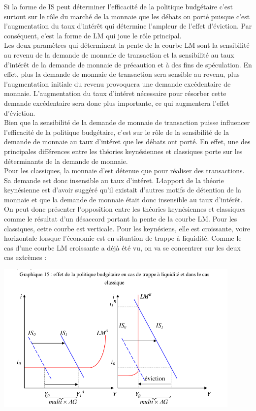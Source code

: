 \documentclass[10pt]{book}
\begin{document}
Si la forme de IS peut déterminer l'efficacité de la politique budgétaire c'est surtout sur le rôle du marché de la monnaie que les débats on porté puisque c'est l'augmentation du taux d'intérêt qui détermine l'ampleur de  l'effet d'éviction. Par conséquent, c'est la forme de LM qui joue le rôle principal. \\
Les deux paramètres qui déterminent la pente de la courbe LM sont la sensibilité au revenu de la demande de monnaie de transaction et la sensibilité au taux d'intérêt de la demande de monnaie de précaution et à des fins de spéculation. En effet, plus la demande de monnaie de transaction sera sensible au revenu, plus l'augmentation initiale du revenu provoquera une demande excédentaire de monnaie. L'augmentation du taux d'intéret nécessaire pour résorber cette demande excédentaire sera donc plus importante, ce qui augmentera l'effet d'éviction. \\
Bien que la sensibilité de la demande de monnaie de transaction puisse influencer l'efficacité de la politique budgétaire, c'est sur le rôle de la sensibilité de la demande de monnaie au taux d'intéret que les débats ont porté. En effet, une des principales différences entre les théories keynésiennes et classiques porte sur les déterminants de la demande de monnaie. \\
Pour les classiques, la monnaie d'est détenue que pour réaliser des transactions. Sa demande est donc insensible au taux d'intéret. L4apport de la théorie keynésienne est d'avoir suggéré qu'il existait d'autres motifs de détention de la monnaie et que la demande de monnaie était donc insensible au taux d'intérêt. \\
On peut donc présenter l'opposition entre les théories keynésiennes et classiques comme le résultat d'un désaccord portant la pente de la courbe LM. Pour les classiques, cette courbe est verticale. Pour les keynésiens, elle est croissante, voire horizontale lorsque l'économie est en situation de trappe à liquidité. Comme le cas d'une courbe LM croissante a déjà été vu, on va se concentrer sur les deux cas extrèmes :
\begin{center}
  \includegraphics[width=12cm]{graph40.png}
\end{center}
\end{document}
